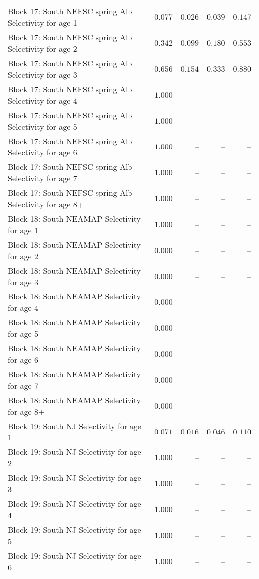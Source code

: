 \documentclass[
]{article}
\begin{document}
\begin{landscape}
\begin{longtable}[t]{lrrrr}
Block 17: South NEFSC spring Alb Selectivity for age 1 & $0.077$ & $0.026$ & $0.039$ & $0.147$\\
Block 17: South NEFSC spring Alb Selectivity for age 2 & $0.342$ & $0.099$ & $0.180$ & $0.553$\\
Block 17: South NEFSC spring Alb Selectivity for age 3 & $0.656$ & $0.154$ & $0.333$ & $0.880$\\
Block 17: South NEFSC spring Alb Selectivity for age 4 & $1.000$ & -- & -- & --\\
\addlinespace
Block 17: South NEFSC spring Alb Selectivity for age 5 & $1.000$ & -- & -- & --\\
Block 17: South NEFSC spring Alb Selectivity for age 6 & $1.000$ & -- & -- & --\\
Block 17: South NEFSC spring Alb Selectivity for age 7 & $1.000$ & -- & -- & --\\
Block 17: South NEFSC spring Alb Selectivity for age 8+ & $1.000$ & -- & -- & --\\
Block 18: South NEAMAP Selectivity for age 1 & $1.000$ & -- & -- & --\\
\addlinespace
Block 18: South NEAMAP Selectivity for age 2 & $0.000$ & -- & -- & --\\
Block 18: South NEAMAP Selectivity for age 3 & $0.000$ & -- & -- & --\\
Block 18: South NEAMAP Selectivity for age 4 & $0.000$ & -- & -- & --\\
Block 18: South NEAMAP Selectivity for age 5 & $0.000$ & -- & -- & --\\
Block 18: South NEAMAP Selectivity for age 6 & $0.000$ & -- & -- & --\\
\addlinespace
Block 18: South NEAMAP Selectivity for age 7 & $0.000$ & -- & -- & --\\
Block 18: South NEAMAP Selectivity for age 8+ & $0.000$ & -- & -- & --\\
Block 19: South NJ Selectivity for age 1 & $0.071$ & $0.016$ & $0.046$ & $0.110$\\
Block 19: South NJ Selectivity for age 2 & $1.000$ & -- & -- & --\\
Block 19: South NJ Selectivity for age 3 & $1.000$ & -- & -- & --\\
\addlinespace
Block 19: South NJ Selectivity for age 4 & $1.000$ & -- & -- & --\\
Block 19: South NJ Selectivity for age 5 & $1.000$ & -- & -- & --\\
Block 19: South NJ Selectivity for age 6 & $1.000$ & -- & -- & --\\

\end{longtable}
\end{landscape}
\end{document}
